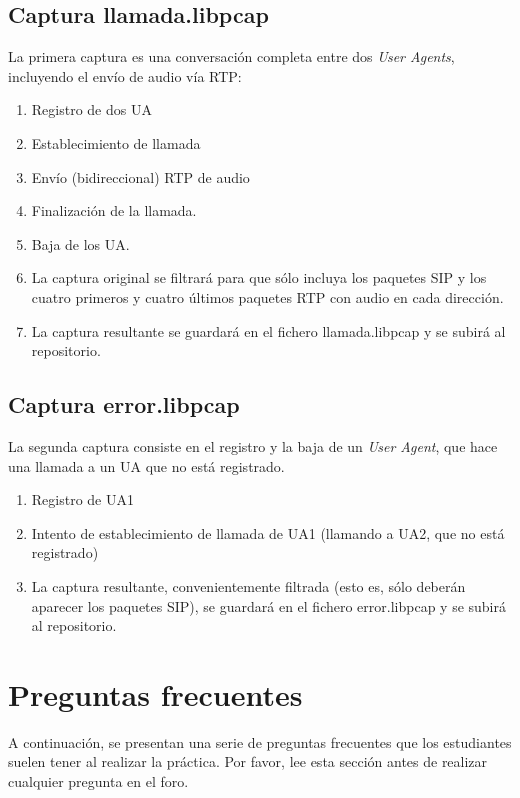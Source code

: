 \documentclass[a4paper,11pt]{article}
\begin{document}
\subsection{Captura llamada.libpcap}

La primera captura es una conversación completa entre dos \emph{User Agents}, incluyendo el envío de audio vía RTP:

\begin{enumerate}
  \item Registro de dos UA
  \item Establecimiento de llamada
  \item Envío (bidireccional) RTP de audio
  \item Finalización de la llamada.
  \item Baja de los UA.
  \item La captura original se filtrará para que sólo incluya los paquetes
SIP y los cuatro primeros y cuatro últimos paquetes RTP con audio en cada dirección.
  \item La captura resultante se guardará en el fichero llamada.libpcap
y se subirá al repositorio.
\end{enumerate}

\subsection{Captura error.libpcap}

La segunda captura consiste en el registro y la baja de un \emph{User Agent}, que hace una llamada a un UA que no está registrado.

\begin{enumerate}
  \item Registro de UA1
  \item Intento de establecimiento de llamada de UA1 (llamando a UA2, que no está registrado)
  \item La captura resultante, convenientemente filtrada (esto es, sólo deberán aparecer los paquetes SIP), se guardará en el fichero error.libpcap
y se subirá al repositorio.
\end{enumerate}

\newpage
\section{Preguntas frecuentes}

A continuación, se presentan una serie de preguntas frecuentes que los estudiantes
suelen tener al realizar la práctica. Por favor, lee esta sección antes de realizar
cualquier pregunta en el foro.
\end{document}
